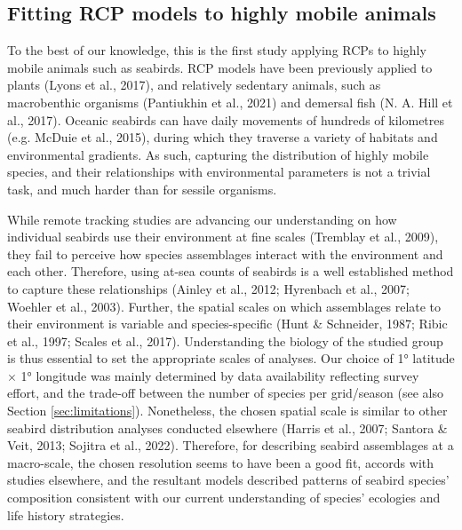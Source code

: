 \documentclass{article}
\begin{document}
\begin{linenumbers}
\hypertarget{fitting-rcp-models-to-highly-mobile-animals}{%
\subsection{Fitting RCP models to highly mobile animals}\label{fitting-rcp-models-to-highly-mobile-animals}}

To the best of our knowledge, this is the first study applying RCPs to highly mobile animals such as seabirds. RCP models have been previously applied to plants (Lyons et al., 2017), and relatively sedentary animals, such as macrobenthic organisms (Pantiukhin et al., 2021) and demersal fish (N. A. Hill et al., 2017). Oceanic seabirds can have daily movements of hundreds of kilometres (e.g. McDuie et al., 2015), during which they traverse a variety of habitats and environmental gradients. As such, capturing the distribution of highly mobile species, and their relationships with environmental parameters is not a trivial task, and much harder than for sessile organisms.

While remote tracking studies are advancing our understanding on how individual seabirds use their environment at fine scales (Tremblay et al., 2009), they fail to perceive how species assemblages interact with the environment and each other. Therefore, using at-sea counts of seabirds is a well established method to capture these relationships (Ainley et al., 2012; Hyrenbach et al., 2007; Woehler et al., 2003). Further, the spatial scales on which assemblages relate to their environment is variable and species-specific (Hunt \& Schneider, 1987; Ribic et al., 1997; Scales et al., 2017). Understanding the biology of the studied group is thus essential to set the appropriate scales of analyses. Our choice of 1° latitude \(\times\) 1° longitude was mainly determined by data availability reflecting survey effort, and the trade-off between the number of species per grid/season (see also Section \ref{sec:limitations}). Nonetheless, the chosen spatial scale is similar to other seabird distribution analyses conducted elsewhere (Harris et al., 2007; Santora \& Veit, 2013; Sojitra et al., 2022). Therefore, for describing seabird assemblages at a macro-scale, the chosen resolution seems to have been a good fit, accords with studies elsewhere, and the resultant models described patterns of seabird species' composition consistent with our current understanding of species' ecologies and life history strategies.


\end{linenumbers}
\end{document}
